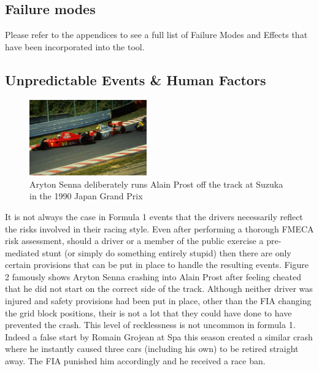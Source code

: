 \documentclass[12pt]{article} %
\begin{document}
\subsection{Failure modes}

Please refer to the appendices to see a full list of Failure Modes and Effects that have been incorporated into the tool.

\subsection{Unpredictable Events \& Human Factors} %


\begin{figure} %
  \begin{center}
    \includegraphics[width=0.45\textwidth]{senna-prost}
  \end{center}
\parbox{7cm}{\caption{Aryton Senna deliberately runs Alain Prost off the track at Suzuka in the 1990 Japan Grand Prix}}
\end{figure}

It is not always the case in Formula 1 events that the drivers necessarily reflect the risks involved in their racing style. Even after performing a thorough FMECA risk assessment, should a driver or a member of the public exercise a pre-mediated stunt (or simply do something entirely stupid) then there are only certain provisions that can be put in place to handle the resulting events. Figure 2 famously shows Aryton Senna crashing into Alain Prost after feeling cheated that he did not start on the correct side of the track. Although neither driver was injured and safety provisions had been put in place, other than the FIA changing the grid block positions, their is not a lot that they could have done to have prevented the crash. This level of recklessness is not uncommon in formula 1. Indeed a false start by Romain Grojean at Spa this season created a similar crash where he instantly caused three cars (including his own) to be retired straight away. The FIA punished him accordingly and he received a race ban.
\end{document}
